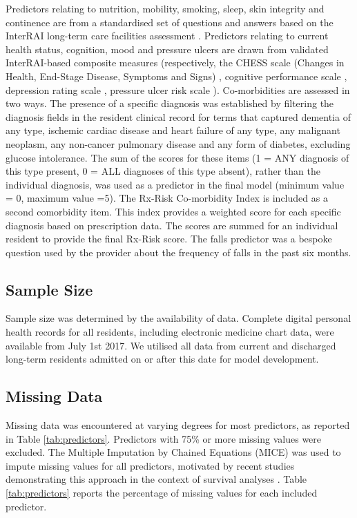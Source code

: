 \documentclass{article}
\begin{document}
\endgroup




Predictors relating to nutrition, mobility, smoking, sleep, skin integrity and continence are from a standardised set of questions and answers based on the InterRAI long-term care facilities assessment \cite{interRAI}. Predictors relating to current health status, cognition, mood and pressure ulcers are drawn from validated InterRAI-based composite measures (respectively, the CHESS scale (Changes in Health, End-Stage Disease, Symptoms and Signs) \cite{hirdes2014use, ogarek2018minimum}, cognitive performance scale \cite{travers2013validation}, depression rating scale \cite{penny2016convergent}, pressure ulcer risk scale \cite{poss2010development}).  Co-morbidities are assessed in two ways. The presence of a specific diagnosis was established by filtering the diagnosis fields in the resident clinical record for terms that captured dementia of any type, ischemic cardiac disease and heart failure of any type, any malignant neoplasm, any non-cancer pulmonary disease and any form of diabetes, excluding glucose intolerance. The sum of the scores for these items (1 = ANY diagnosis of this type present, 0 = ALL diagnoses of this type absent), rather than the individual diagnosis, was used as a predictor in the final model (minimum value = 0, maximum value =5).  The Rx-Risk Co-morbidity Index is included as a second comorbidity item. This index provides a weighted score for each specific diagnosis based on prescription data.  The scores are summed for an individual resident to provide the final Rx-Risk score. The falls predictor was a bespoke question used by the provider about the frequency of falls in the past six months.

\subsection{Sample Size}
Sample size was determined by the availability of data.  Complete digital personal health records for all residents, including electronic medicine chart data, were available from July 1st 2017.  We utilised all data from current and discharged long-term residents admitted on or after this date for model development.

\subsection{ Missing Data}
Missing data was encountered at varying degrees for most predictors, as reported in Table \ref{tab:predictors}.  Predictors with 75\% or more missing values were excluded. The Multiple Imputation by Chained Equations (MICE) \cite{raghunathan2001multivariate,van2007multiple} was used to impute missing values for all predictors, motivated by recent studies demonstrating this approach in the context of survival analyses \cite{qi2018strategies,mera2021evaluating}. Table \ref{tab:predictors} reports the percentage of missing values for each included predictor.
\end{document}
